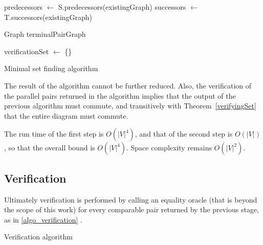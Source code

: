 \documentclass[sigplan,review,anonymous]{acmart}
\begin{document}
{\begin{algorithm}
predecessors $\gets$ S.predecessors(existingGraph)\;
successors $\gets$ T.successors(existingGraph)\;

Graph terminalPairGraph\;

verificationSet $\gets$ \{\}\;
\;
\caption{Minimal set finding algorithm}
\label{algo_online_minimal}
\end{algorithm}

The result of the algorithm cannot be further reduced.
 
Also, the verification of the parallel pairs returned in the algorithm implies that the output of the previous algorithm must commute, and transitively with Theorem~\ref{verifyingSet} that the entire diagram must commute.

The run time of the first step is $O(|V|^4)$, and that of the second step is $O(|V|)$, so that the overall bound is $O(|V|^4)$.
Space complexity remains $O(|V|^2)$.

\subsection{Verification}
Ultimately verification is performed by calling an equality oracle (that is beyond the scope of this work) for every comparable pair returned by the previous stage, as in \ref{algo_verification} .

\begin{algorithm}
\DontPrintSemicolon
{}
\;
\caption{Verification algorithm}\label{algo_verification}
\end{algorithm}

}
\end{document}
